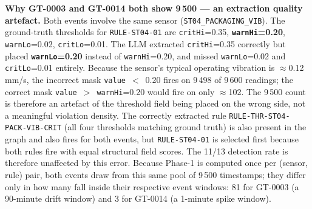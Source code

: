 ﻿\documentclass[11pt]{article}
\begin{document}
\begin{table}[H]
\begin{minipage}{\textwidth}
\medskip
\textbf{Why GT-0003 and GT-0014 both show 9\,500 — an extraction quality artefact.}
Both events involve the same sensor (\texttt{ST04\_PACKAGING\_VIB}).
The ground-truth thresholds for \texttt{RULE-ST04-01} are
\texttt{critHi}=0.35, \textbf{\texttt{warnHi}=0.20},
\texttt{warnLo}=0.02, \texttt{critLo}=0.01.
The LLM extracted \texttt{critHi}=0.35 correctly but placed
\textbf{\texttt{warnLo}=0.20} instead of \texttt{warnHi}=0.20,
and missed \texttt{warnLo}=0.02 and \texttt{critLo}=0.01 entirely.
Because the sensor's typical operating vibration is
$\approx$0.12\,mm/s, the incorrect mask
\texttt{value}~$<$~0.20 fires on 9\,498 of 9\,600 readings;
the correct mask \texttt{value}~$>$~\texttt{warnHi}=0.20 would fire
on only $\approx$102.
The 9\,500 count is therefore an artefact of the threshold field
being placed on the wrong side, not a meaningful violation density.
The correctly extracted rule \texttt{RULE-THR-ST04-PACK-VIB-CRIT}
(all four thresholds matching ground truth) is also present in the
graph and also fires for both events, but \texttt{RULE-ST04-01} is
selected first because both rules fire with equal structural field
scores.
The 11/13 detection rate is therefore unaffected by this error.
Because Phase-1 is computed once per (sensor, rule) pair, both events
draw from this same pool of 9\,500 timestamps; they differ only in
how many fall inside their respective event windows: 81 for GT-0003
(a 90-minute drift window) and 3 for GT-0014 (a 1-minute spike window).


\end{minipage}
\end{table}
\end{document}
